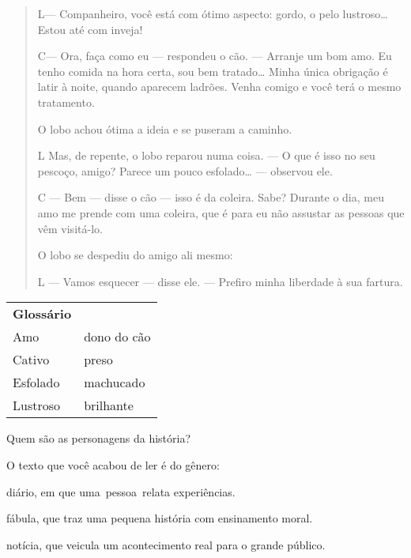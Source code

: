 \begin{escolha}
\begin{escolha}
{\begin{escolha}
\begin{quote}
L--- Companheiro, você está com ótimo aspecto: gordo, o pelo
lustroso\ldots{} Estou até com inveja!

C--- Ora, faça como eu --- respondeu o cão. --- Arranje um bom amo. Eu
tenho comida na hora certa, sou bem tratado\ldots{} Minha única
obrigação é latir à noite, quando aparecem ladrões. Venha comigo e você
terá o mesmo tratamento.

O lobo achou ótima a ideia e se puseram a caminho.

L Mas, de repente, o lobo reparou numa coisa. --- O que é isso no seu
pescoço, amigo? Parece um pouco esfolado\ldots{} --- observou ele.

C --- Bem --- disse o cão --- isso é da coleira. Sabe? Durante o dia,
meu amo me prende com uma coleira, que é para eu não assustar as pessoas
que vêm visitá-lo.

O lobo se despediu do amigo ali mesmo:

L --- Vamos esquecer --- disse ele. --- Prefiro minha liberdade à sua
fartura.
\end{quote}


\begin{tabular}{ll}
\textbf{Glossário} & \mbox{}\\
Amo & dono do cão\\
Cativo & preso\\
Esfolado & machucado\\
Lustroso & brilhante\\
\end{tabular}

\begin{escolha}
\item Quem são as personagens da história?


\item O texto que você acabou de ler é do gênero:

\begin{boxlist}
\boxitem[] diário, em que uma~pessoa~relata experiências.

\boxitem[\rosa{X}] fábula, que traz uma pequena história com ensinamento moral.

\boxitem[] notícia, que veicula um acontecimento real para o grande público.
\end{boxlist}


\end{escolha}
\end{escolha}}
\end{escolha}
\end{escolha}
